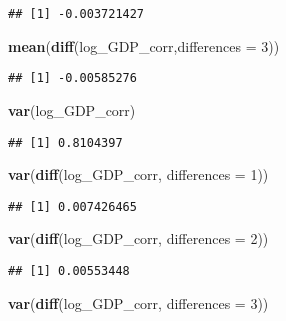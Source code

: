 \documentclass[]{book}
\newenvironment{Shaded}{\begin{snugshade}}{\end{snugshade}}
\newcommand{\KeywordTok}[1]{\textcolor[rgb]{0.13,0.29,0.53}{\textbf{#1}}}
\newcommand{\DataTypeTok}[1]{\textcolor[rgb]{0.13,0.29,0.53}{#1}}
\newcommand{\DecValTok}[1]{\textcolor[rgb]{0.00,0.00,0.81}{#1}}
\newcommand{\NormalTok}[1]{#1}
\theoremstyle{definition}
\theoremstyle{definition}
\theoremstyle{definition}
\theoremstyle{remark}
\begin{document}
\begin{verbatim}
## [1] -0.003721427
\end{verbatim}

\begin{Shaded}
\begin{Highlighting}[]
\KeywordTok{mean}\NormalTok{(}\KeywordTok{diff}\NormalTok{(log_GDP_corr,}\DataTypeTok{differences =} \DecValTok{3}\NormalTok{))}
\end{Highlighting}
\end{Shaded}

\begin{verbatim}
## [1] -0.00585276
\end{verbatim}

\begin{Shaded}
\begin{Highlighting}[]
\KeywordTok{var}\NormalTok{(log_GDP_corr)}
\end{Highlighting}
\end{Shaded}

\begin{verbatim}
## [1] 0.8104397
\end{verbatim}

\begin{Shaded}
\begin{Highlighting}[]
\KeywordTok{var}\NormalTok{(}\KeywordTok{diff}\NormalTok{(log_GDP_corr, }\DataTypeTok{differences =} \DecValTok{1}\NormalTok{))}
\end{Highlighting}
\end{Shaded}

\begin{verbatim}
## [1] 0.007426465
\end{verbatim}

\begin{Shaded}
\begin{Highlighting}[]
\KeywordTok{var}\NormalTok{(}\KeywordTok{diff}\NormalTok{(log_GDP_corr, }\DataTypeTok{differences =} \DecValTok{2}\NormalTok{))}
\end{Highlighting}
\end{Shaded}

\begin{verbatim}
## [1] 0.00553448
\end{verbatim}

\begin{Shaded}
\begin{Highlighting}[]
\KeywordTok{var}\NormalTok{(}\KeywordTok{diff}\NormalTok{(log_GDP_corr, }\DataTypeTok{differences =} \DecValTok{3}\NormalTok{))}
\end{Highlighting}
\end{Shaded}
\end{document}
